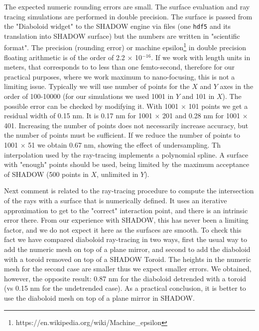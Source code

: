 \documentclass{iucr}              %
\newcommand{\inred}[1]{{\color{red}#1}}
\begin{document}

 
The expected numeric rounding errors are small. The surface evaluation and ray tracing simulations are performed in double precision. The surface is passed from the "Diaboloid widget" to the SHADOW engine via files (one {\tt hdf5} and its translation into SHADOW surface) but the numbers are written in "scientific format". The precision (rounding error) or machine epsilon\footnote{ https://en.wikipedia.org/wiki/Machine\_epsilon} in double precision floating arithmetic is of the order of 2.2 $\times$ 10$^{-16}$. If we work with length units in meters, that corresponds to to less than one femto-second, therefore for our practical purposes, where we work maximum to nano-focusing, this is not a limiting issue. Typically we will use number of points for the $X$ and $Y$ axes in the order of 100-10000 (for our simulations we used 1001 in $Y$ and 101 in $X$). The possible error can be checked by modifying it. With 1001 $\times$ 101 points we get a residual width of 0.15 nm. It is 0.17 nm for 1001 $\times$ 201 and 0.28 nm for 1001 $\times$ 401. Increasing the number of points does not necessarily increase accuracy, but the number of points must be sufficient. If we reduce the number of points to 1001 $\times$ 51 we obtain 0.67 nm, showing the effect of undersampling. Th interpolation used by the ray-tracing implements a polynomial spline. A surface with "enough" points should be used, being limited by the maximum acceptance of SHADOW (500 points in $X$, unlimited in $Y$). 

Next comment is related to the ray-tracing procedure to compute the intersection of the rays with a surface that is numerically defined. It uses an iterative approximation to get to the "correct" interaction point, and there is an intrinsic error there. From our experience with SHADOW, this has never been a limiting factor, and we do not expect it here as the surfaces are smooth. To check this fact we have compared  diaboloid ray-tracing in two ways, first the usual way to add the numeric mesh on top of a plane mirror, and second to add the diaboloid with a toroid removed on top of a SHADOW Toroid. The heights in the numeric mesh for the second case are smaller thus we expect smaller errors. \inred{We obtained, however, the opposite result: 0.87 nm for the diaboloid detrended with a toroid (vs 0.15 nm for the undetrended case).} As a practical conclusion, it is better to use the diaboloid mesh on top of a plane mirror in SHADOW.
\end{document}
